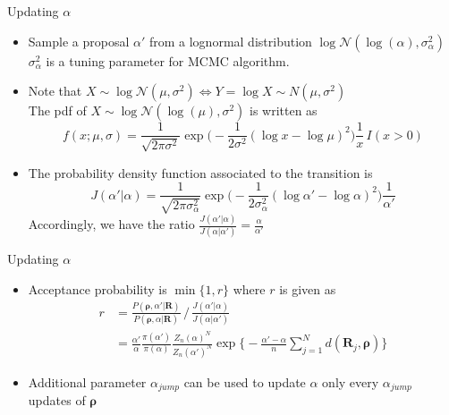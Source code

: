 \documentclass[11pt]{beamer}
\begin{document}
\begin{frame}{Updating $\alpha$}
\begin{itemize}
    \item Sample a proposal $\alpha '$ from a lognormal distribution $\log\mathcal{N}(\log(\alpha), \sigma_\alpha^2)$ \\ $\sigma_\alpha^2$ is a tuning parameter for MCMC algorithm.
    \item Note that $X\sim \log\mathcal{N}(\mu, \sigma^2)\Leftrightarrow Y=\log X\sim N(\mu, \sigma^2)$ \\ The pdf of $X\sim \log\mathcal{N}(\log(\mu), \sigma^2)$ is written as $$f(x ; \mu, \sigma)=\frac{1}{\sqrt{2\pi \sigma^2}}\exp\bigl(-\frac{1}{2\sigma^2}(\log x -\log \mu)^2 \bigr)\frac{1}{x}\,I(x>0)$$
    \item The probability density function associated to the transition is $$J(\alpha'|\alpha)=\frac{1}{\sqrt{2\pi \sigma_\alpha^2}}\exp\bigl(-\frac{1}{2\sigma_\alpha^2}(\log \alpha' -\log \alpha)^2 \bigr)\frac{1}{\alpha'}$$
    Accordingly, we have the ratio $\frac{J(\alpha'|\alpha)}{J(\alpha|\alpha')}=\frac{\alpha}{\alpha'}$ 
\end{itemize}
\end{frame}

\begin{frame}{Updating $\alpha$}
\begin{itemize}
    \item Acceptance probability is $\min\{1, r\}$ where $r$  is given as 
    \begin{align*}
        r &= \frac{P(\boldsymbol{\rho}, \alpha' | \mathbf{R})}{P(\boldsymbol{\rho}, \alpha | \mathbf{R})} \,/\, \frac{J(\alpha'|\alpha)}{J(\alpha|\alpha')} \\ &= \frac{\alpha'}{\alpha}\frac{\pi(\alpha')}{\pi(\alpha)}\frac{Z_n(\alpha)^N}{Z_n(\alpha')^N}\exp \big\{-\frac{\alpha'-\alpha}{n}\sum_{j=1}^N d(\mathbf{R}_j, \boldsymbol{\rho})\big\}
    \end{align*}
    \item Additional parameter $\alpha_{jump}$ can be used to update $\alpha$ only every $\alpha_{jump}$ updates of $\boldsymbol{\rho}$
\end{itemize}
\end{frame}
\end{document}

